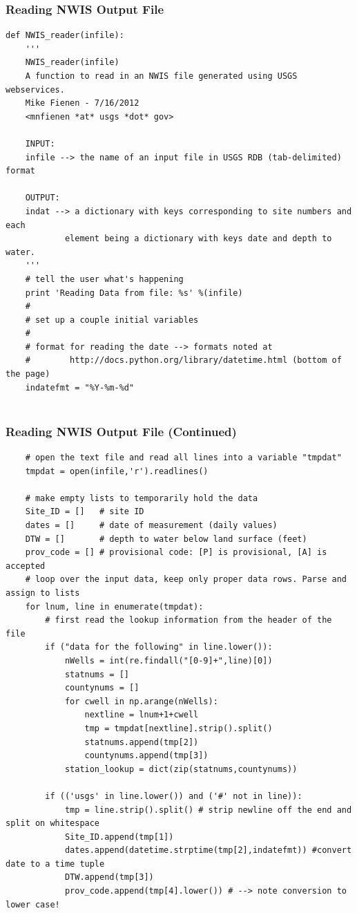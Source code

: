 \documentclass{beamer}
\begin{document}
\begin{frame}[fragile]
\frametitle{Reading NWIS Output File}
\begin{lstlisting}
def NWIS_reader(infile):
    '''
    NWIS_reader(infile)
    A function to read in an NWIS file generated using USGS webservices.
    Mike Fienen - 7/16/2012
    <mnfienen *at* usgs *dot* gov>
    
    INPUT:
    infile --> the name of an input file in USGS RDB (tab-delimited) format
    
    OUTPUT:
    indat --> a dictionary with keys corresponding to site numbers and each
            element being a dictionary with keys date and depth to water.
    '''
    # tell the user what's happening
    print 'Reading Data from file: %s' %(infile)
    #
    # set up a couple initial variables
    #
    # format for reading the date --> formats noted at 
    #        http://docs.python.org/library/datetime.html (bottom of the page)
    indatefmt = "%Y-%m-%d"
    
\end{lstlisting}
\end{frame}
    
\begin{frame}[fragile]
\frametitle{Reading NWIS Output File (Continued)}
\begin{lstlisting}
    # open the text file and read all lines into a variable "tmpdat"
    tmpdat = open(infile,'r').readlines()
    
    # make empty lists to temporarily hold the data
    Site_ID = []   # site ID
    dates = []     # date of measurement (daily values)
    DTW = []       # depth to water below land surface (feet)
    prov_code = [] # provisional code: [P] is provisional, [A] is accepted
    # loop over the input data, keep only proper data rows. Parse and assign to lists
    for lnum, line in enumerate(tmpdat):
        # first read the lookup information from the header of the file
        if ("data for the following" in line.lower()):
            nWells = int(re.findall("[0-9]+",line)[0])
            statnums = []
            countynums = []
            for cwell in np.arange(nWells):
                nextline = lnum+1+cwell
                tmp = tmpdat[nextline].strip().split()
                statnums.append(tmp[2])
                countynums.append(tmp[3])
            station_lookup = dict(zip(statnums,countynums))
                
        if (('usgs' in line.lower()) and ('#' not in line)):
            tmp = line.strip().split() # strip newline off the end and split on whitespace
            Site_ID.append(tmp[1])
            dates.append(datetime.strptime(tmp[2],indatefmt)) #convert date to a time tuple
            DTW.append(tmp[3])
            prov_code.append(tmp[4].lower()) # --> note conversion to lower case!
\end{lstlisting}
\end{frame}
\end{document}
